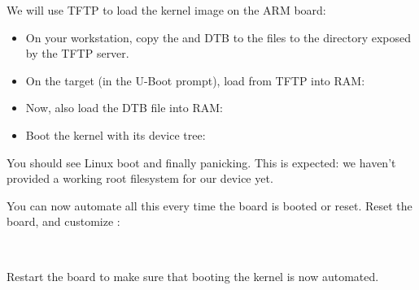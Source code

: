 {}
{}

We will use TFTP to load the kernel image on the ARM board:

\begin{itemize}

\item On your workstation, copy the  and DTB to the
files to the directory exposed by the TFTP server.

\item On the target (in the U-Boot prompt), load  from
TFTP into RAM:
{}
{}

\item Now, also load the DTB file into RAM:\\
{}
{}

\item Boot the kernel with its device tree:\\
{}
{}

\end{itemize}

You should see Linux boot and finally panicking. This is expected: we
haven't provided a working root filesystem for our device yet.

You can now automate all this every time the board is booted or
reset. Reset the board, and customize :

\scriptsize
{}
{
\\
}
\normalsize

Restart the board to make sure that booting the kernel is now automated.

